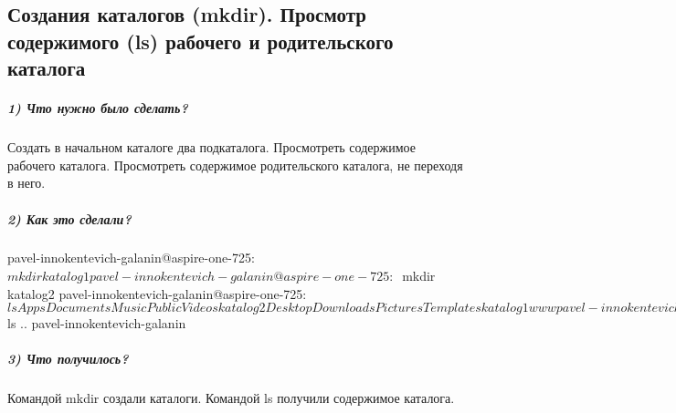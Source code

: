 \subsection{Создания каталогов (mkdir). Просмотр содержимого (ls) рабочего и родительского каталога}

\subparagraph{1) Что нужно было сделать?}

Создать в начальном каталоге два подкаталога. Просмотреть содержимое рабочего каталога. Просмотреть содержимое родительского каталога, не переходя в него.

\subparagraph{2) Как это сделали?}

\begin{MyVerbatimCode}[label=Debian terminal]
pavel-innokentevich-galanin@aspire-one-725:~$ mkdir katalog1
pavel-innokentevich-galanin@aspire-one-725:~$ mkdir katalog2
pavel-innokentevich-galanin@aspire-one-725:~$ ls
Apps     Documents  Music     Public     Videos    katalog2
Desktop  Downloads  Pictures  Templates  katalog1  www
pavel-innokentevich-galanin@aspire-one-725:~$ ls ..
pavel-innokentevich-galanin
\end{MyVerbatimCode}

\subparagraph{3) Что получилось?}

Командой mkdir создали каталоги. Командой ls получили содержимое каталога.
